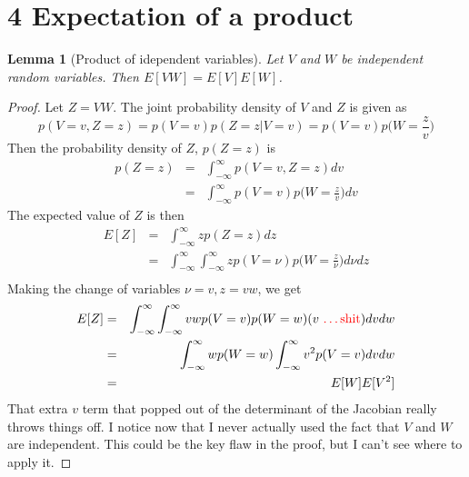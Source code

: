 \documentclass[11pt]{article}
\newtheorem{lemma}{Lemma}[section]
\begin{document}
\section*{4 Expectation of a product}
\begin{lemma}[Product of idependent variables]
    Let $V$ and $W$ be independent random variables. Then $E[VW] = E[V]E[W]$.
\end{lemma}
\begin{proof}
    Let $Z=VW$.
    The joint probability density of $V$ and $Z$ is given as
    \begin{equation}
        p(V=v,Z=z) = p(V=v)p(Z=z|V=v) = p(V=v)p\bigg(W=\frac{z}{v}\bigg)
    \end{equation}
    Then the probability density of $Z$, $p(Z=z)$ is
    \begin{eqnarray}
        p(Z=z) &=& \int_{-\infty}^{\infty}p(V=v,Z=z)dv \\
        &=& \int_{-\infty}^{\infty}p(V=v)p\bigg(W=\frac{z}{v}\bigg)dv
        \label{eqn: indep_prod_density}
    \end{eqnarray}
    The expected value of $Z$ is then
    \begin{eqnarray}
        E[Z] &=& \int_{-\infty}^{\infty} zp(Z=z) dz \nonumber \\
            &=& \int_{-\infty}^{\infty} \int_{-\infty}^{\infty}z p(V=\nu)p\bigg(W=\frac{z}{\nu}\bigg)d\nu dz \\
        \label{eqn: full_expected_indep_prod}
    \end{eqnarray}
    Making the change of variables $\nu = v, z = vw$, we get
    \begin{eqnarray}
        E[Z] &=& \int_{-\infty}^{\infty} \int_{-\infty}^{\infty}
            vwp(V=v)p(W=w) (v \text{ \color{red}{\dots shit}}) dv dw \\
            &=& \int_{-\infty}^{\infty} wp(W=w) \int_{-\infty}^{\infty} v^2 p(V=v) dv dw \\
            &=& E[W]E[V^2]
    \end{eqnarray}
    That extra $v$ term that popped out of the determinant of the Jacobian really throws things off.
    I notice now that I never actually used the fact that $V$ and $W$ are independent.
    This could be the key flaw in the proof, but I can't see where to apply it.


\end{proof}
\end{document}
